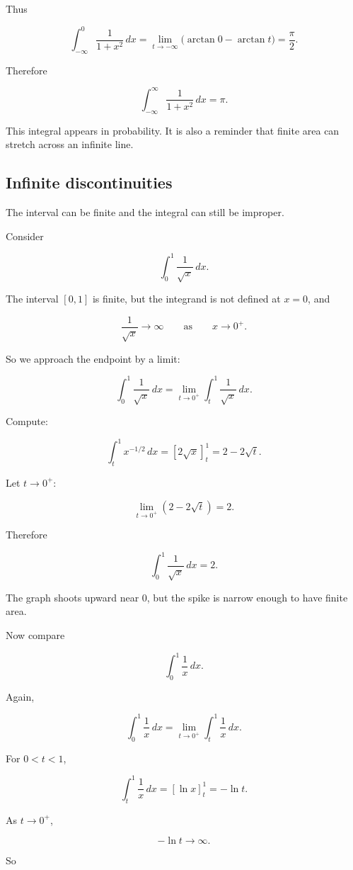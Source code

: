 Thus

\[
\int_{-\infty}^0 \frac{1}{1+x^2}\,dx
=
\lim_{t\to-\infty}\bigl(\arctan 0-\arctan t\bigr)
=
\frac{\pi}{2}.
\]

Therefore

\[
\boxed{
\int_{-\infty}^{\infty} \frac{1}{1+x^2}\,dx=\pi.
}
\]

This integral appears in probability.  It is also a reminder that finite area can stretch
across an infinite line.

\subsection{Infinite discontinuities}
\label{subsec:infinite-discontinuities}

The interval can be finite and the integral can still be improper.

Consider

\[
\int_0^1 \frac{1}{\sqrt{x}}\,dx.
\]

The interval \([0,1]\) is finite, but the integrand is not defined at \(x=0\), and

\[
\frac{1}{\sqrt{x}}\to\infty
\qquad\text{as}\qquad
x\to0^+.
\]

So we approach the endpoint by a limit:

\[
\int_0^1 \frac{1}{\sqrt{x}}\,dx
=
\lim_{t\to0^+}\int_t^1 \frac{1}{\sqrt{x}}\,dx.
\]

Compute:

\[
\int_t^1 x^{-1/2}\,dx
=
\left[2\sqrt{x}\right]_t^1
=
2-2\sqrt{t}.
\]

Let \(t\to0^+\):

\[
\lim_{t\to0^+}(2-2\sqrt{t})=2.
\]

Therefore

\[
\boxed{
\int_0^1 \frac{1}{\sqrt{x}}\,dx=2.
}
\]

The graph shoots upward near \(0\), but the spike is narrow enough to have finite area.

Now compare

\[
\int_0^1 \frac1x\,dx.
\]

Again,

\[
\int_0^1 \frac1x\,dx
=
\lim_{t\to0^+}\int_t^1 \frac1x\,dx.
\]

For \(0<t<1\),

\[
\int_t^1 \frac1x\,dx
=
\left[\ln x\right]_t^1
=
-\ln t.
\]

As \(t\to0^+\),

\[
-\ln t\to\infty.
\]

So


